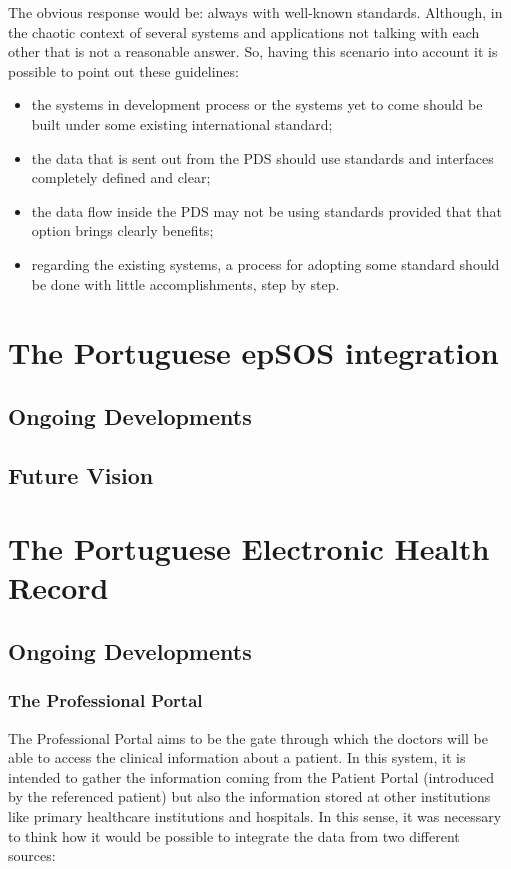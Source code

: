 The obvious response would be: always with well-known standards. Although, in the chaotic context of several systems and applications not talking with each other that is not a reasonable answer. So, having this scenario into account it is possible to point out these guidelines:
\begin{itemize}
\item the systems in development process or the systems yet to come should be built under some existing international standard;
\item the data that is sent out from the PDS should use standards and interfaces completely defined and clear;
\item the data flow inside the PDS may not be using standards provided that that option brings clearly benefits;
\item regarding the existing systems, a process for adopting some standard should be done with little accomplishments, step by step.
\end{itemize}



\section{The Portuguese epSOS integration}

\subsection{Ongoing Developments}

\subsection{Future Vision}



\section{The Portuguese Electronic Health Record}

\subsection{Ongoing Developments}

\subsubsection{The Professional Portal}
The Professional Portal aims to be the gate through which the doctors will be able to access the clinical information about a patient. In this system, it is intended to gather the information coming from the Patient Portal (introduced by the referenced patient) but also the information stored at other institutions like primary healthcare institutions and hospitals. In this sense, it was necessary to think how it would be possible to integrate the data from two different sources:

